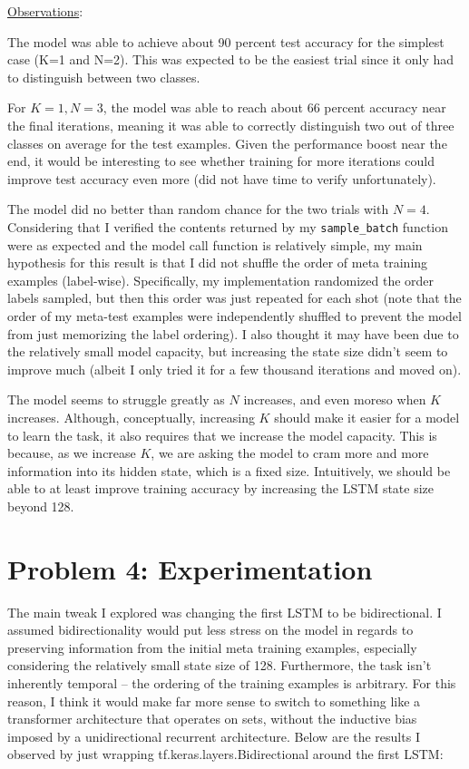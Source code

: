 \documentclass[11pt]{article}
\begin{document}
\underline{Observations}: 
\begin{compactitem}
	\item The model was able to achieve about 90 percent test accuracy for the simplest case (K=1 and N=2). This was expected to be the easiest trial since it only had to distinguish between two classes. 
	
	\item For $K=1, N=3$, the model was able to reach about 66 percent accuracy near the final iterations, meaning it was able to correctly distinguish two out of three classes on average for the test examples. Given the performance boost near the end, it would be interesting to see whether training for more iterations could improve test accuracy even more (did not have time to verify unfortunately). 
	
	\item The model did no better than random chance for the two trials with $N = 4$. Considering that I verified the contents returned by my \texttt{sample\_batch} function were as expected and the model call function is relatively simple, my main hypothesis for this result is that I did not shuffle the order of meta training examples (label-wise). Specifically, my implementation randomized the order labels sampled, but then this order was just repeated for each shot (note that the order of my meta-test examples were independently shuffled to prevent the model from just memorizing the label ordering). I also thought it may have been due to the relatively small model capacity, but increasing the state size didn't seem to improve much (albeit I only tried it for a few thousand iterations and moved on). 
	\item The model seems to struggle greatly as $N$ increases, and even moreso when $K$ increases. Although, conceptually, increasing $K$ should make it easier for a model to learn the task, it also requires that we increase the model capacity. This is because, as we increase $K$, we are asking the model to cram more and more information into its hidden state, which is a fixed size. Intuitively, we should be able to at least improve training accuracy by increasing the LSTM state size beyond 128. 
\end{compactitem}

\clearpage
\section*{Problem 4: Experimentation}

The main tweak I explored was changing the first LSTM to be bidirectional. I assumed bidirectionality would put less stress on the model in regards to preserving information from the initial meta training examples, especially considering the relatively small state size of 128. Furthermore, the task isn't inherently temporal -- the ordering of the training examples is arbitrary. For this reason, I think it would make far more sense to switch to something like a transformer architecture that operates on sets, without the inductive bias imposed by a unidirectional recurrent architecture. Below are the results I observed by just wrapping tf.keras.layers.Bidirectional around the first LSTM:
\end{document}
